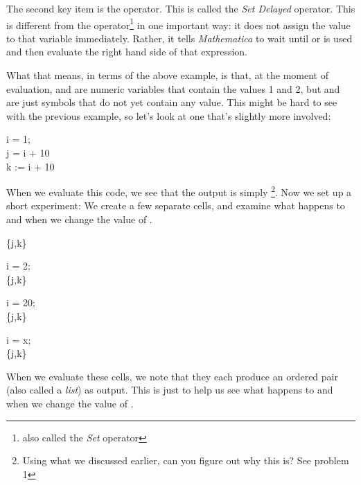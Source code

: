 The second key item is the \expr{:=} operator. This is called the \emph{Set Delayed} operator. This is different from the \expr{=} operator\footnote{also called the \emph{Set} operator} in one important way: it does not assign the value to that variable immediately. Rather, it tells \emph{Mathematica} to wait until  or  is used and then evaluate the right hand side of that expression. 

What that means, in terms of the above example, is that, at the moment of evaluation,  and  are numeric variables that contain the values 1 and 2, but  and  are just symbols that do not yet contain any value. This might be hard to see with the previous example, so let's look at one that's slightly more involved:

\begin{code}
	   \label{code:SetVersusSetDelayed}
	   i = 1;\\
	   j = i + 10\\
	   k := i + 10
\end{code}

When we evaluate this code, we see that the output is simply \footnote{Using what we discussed earlier, can you figure out why this is? See problem 1}. Now we set up a short experiment: We create a few separate cells, and examine what happens to  and  when we change the value of .

\begin{code}
	   \label{code:SetVersusSetDelayed2}
	   \{j,k\}
\end{code}

\begin{code}
	   \label{code:SetVersusSetDelayed3}
	   i = 2;\\
	   \{j,k\}
\end{code}

\begin{code}
	   \label{code:SetVersusSetDelayed4}
	   i = 20;\\
	   \{j,k\}
\end{code}

\begin{code}
	   \label{code:SetVersusSetDelayed5}
	   i = x;\\
	   \{j,k\}
\end{code}

When we evaluate these cells, we note that they each produce an ordered pair (also called a \emph{list}) as output. This is just to help us see what happens to  and  when we change the value of .

